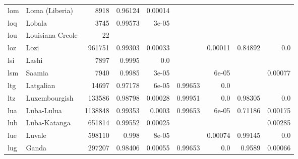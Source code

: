 \documentclass[11pt]{article}
\begin{document}
\begin{table*}[h]
{\begin{tabular}{llrrrrrrr}
lom         & Loma (Liberia)         & 8918         & 0.96124         & 0.00014         &          &          &          &          \\

loq         & Lobala         & 3745         & 0.99573         & 3e-05         &          &          &          &          \\

lou         & Louisiana Creole         & 22         &          &          &          &          &          &          \\

loz         & Lozi         & 961751         & 0.99303         & 0.00033         &          & 0.00011         & 0.84892         & 0.0         \\

lsi         & Lashi         & 7897         & 0.9995         & 0.0         &          &          &          &          \\

lsm         & Saamia         & 7940         & 0.9985         & 3e-05         &          & 6e-05         &          & 0.00077         \\

ltg         & Latgalian         & 14697         & 0.97178         & 6e-05         & 0.99653         & 0.0         &          &          \\

ltz         & Luxembourgish         & 133586         & 0.98798         & 0.00028         & 0.99951         & 0.0         & 0.98305         & 0.0         \\

lua         & Luba-Lulua         & 1138848         & 0.99353         & 0.0003         & 0.99653         & 6e-05         & 0.71186         & 0.00175         \\

lub         & Luba-Katanga         & 651814         & 0.99552         & 0.00025         &          &          &          & 0.00285         \\

lue         & Luvale         & 598110         & 0.998         & 8e-05         &          & 0.00074         & 0.99145         & 0.0         \\

lug         & Ganda         & 297207         & 0.98406         & 0.00055         & 0.99653         & 0.0         & 0.9589         & 0.00066         \\


\end{tabular}}
\end{table*}
\end{document}
